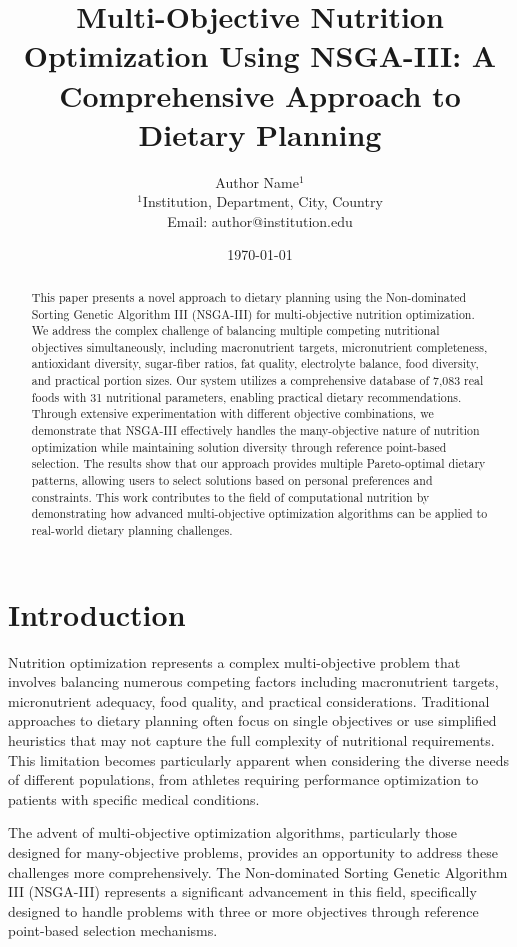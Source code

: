 \documentclass[12pt,a4paper]{article}
\title{Multi-Objective Nutrition Optimization Using NSGA-III: A Comprehensive Approach to Dietary Planning}
\author{
    Author Name$^{1}$ \\
    \small{$^{1}$Institution, Department, City, Country} \\
    \small{Email: author@institution.edu}
}
\date{\today}
\begin{document}
\maketitle

\begin{abstract}
This paper presents a novel approach to dietary planning using the Non-dominated Sorting Genetic Algorithm III (NSGA-III) for multi-objective nutrition optimization. We address the complex challenge of balancing multiple competing nutritional objectives simultaneously, including macronutrient targets, micronutrient completeness, antioxidant diversity, sugar-fiber ratios, fat quality, electrolyte balance, food diversity, and practical portion sizes. Our system utilizes a comprehensive database of 7,083 real foods with 31 nutritional parameters, enabling practical dietary recommendations. Through extensive experimentation with different objective combinations, we demonstrate that NSGA-III effectively handles the many-objective nature of nutrition optimization while maintaining solution diversity through reference point-based selection. The results show that our approach provides multiple Pareto-optimal dietary patterns, allowing users to select solutions based on personal preferences and constraints. This work contributes to the field of computational nutrition by demonstrating how advanced multi-objective optimization algorithms can be applied to real-world dietary planning challenges.
\end{abstract}

\section{Introduction}

Nutrition optimization represents a complex multi-objective problem that involves balancing numerous competing factors including macronutrient targets, micronutrient adequacy, food quality, and practical considerations. Traditional approaches to dietary planning often focus on single objectives or use simplified heuristics that may not capture the full complexity of nutritional requirements. This limitation becomes particularly apparent when considering the diverse needs of different populations, from athletes requiring performance optimization to patients with specific medical conditions.

The advent of multi-objective optimization algorithms, particularly those designed for many-objective problems, provides an opportunity to address these challenges more comprehensively. The Non-dominated Sorting Genetic Algorithm III (NSGA-III) \cite{deb2014evolutionary} represents a significant advancement in this field, specifically designed to handle problems with three or more objectives through reference point-based selection mechanisms.
\end{document}
